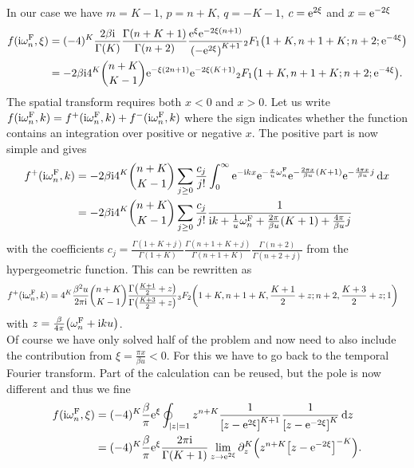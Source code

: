 \documentclass[english, parskip=full]{scrartcl}
\begin{document}
In our case we have $m = K-1$, $p = n+K$, $q = -K-1$, $c = \text{e}^{2\xi}$ and $x= \text{e}^{-2\xi}$
\begin{align}
f(\i\omega_n^\F, \xi) &= (-4)^K \frac{2\beta\i}{\Gamma(K)} \frac{\Gamma(n+K+1)}{\Gamma(n+2)} \frac{\powe{\xi} \powe{-2\xi (n+1)}}{\kla*{-\powe{2\xi}}^{K+1}} {}_2F_1\kla*{1+K, n+1+K; n + 2; \powe{-4\xi}}\\
&= -2\beta \i 4^K \binom{n+K}{K-1} \powe{-\xi(2n+1)} \powe{-2\xi (K+1)} {}_2F_1\kla*{1 + K, n+1+K; n+2; \powe{-4\xi}}.
\end{align}
The spatial transform requires both $x<0$ and $x>0$.
Let us write $f(\text{i}\omega_n^{\text{F}}, k) = f^{+}(\text{i}\omega_n^{\text{F}}, k) + f^{-}(\text{i}\omega_n^{\text{F}}, k)$ where the sign indicates whether the function contains an integration over positive or negative $x$.
The positive part is now simple and gives
\begin{align}
f^{+}(\text{i}\omega_n^{\text{F}}, k) &= -2\beta \text{i} 4^K \binom{n+K}{K-1} \sum_{j\ge 0} \frac{c_j}{j!} \int_{0}^{\infty} \text{e}^{-\text{i} kx} \text{e}^{-\frac{x}{u} \omega_n^{\text{F}}} \text{e}^{-\frac{2\pi x}{\beta u} (K+1)} \text{e}^{- \frac{4\pi x}{\beta u}j}  \,\mathrm{d}x\\
&= -2\beta \text{i} 4^K \binom{n+K}{K-1} \sum_{j\ge 0} \frac{c_j}{j!} \frac{1}{\text{i} k + \frac{1}{u} \omega_n^{\text{F}} + \frac{2\pi}{\beta u} (K+1) + \frac{4\pi}{\beta u}j}
\end{align}
with the coefficients $c_j = \frac{\Gamma(1 + K + j)}{\Gamma(1 + K)} \frac{\Gamma(n + 1 + K + j)}{\Gamma(n + 1 + K)} \frac{\Gamma(n+2)}{\Gamma(n+2+j)}$ from the hypergeometric function.
This can be rewritten as
\begin{align}
f^{+}(\i\omega_n^\F, k) &= 4^K \frac{\beta^2u}{2\pi\i} \binom{n+K}{K-1} \frac{\Gamma\kla*{\frac{K+1}{2} + z}}{\Gamma\kla*{\frac{K+3}{2} + z}} {}_3F_2\kla*{1 + K, n+1+K, \frac{K+1}{2} + z; n+2, \frac{K+3}{2} + z; 1}
\end{align}
with $z = \frac{\beta}{4\pi} \kla*{\omega_n^\F + \i ku}$.
\\
Of course we have only solved half of the problem and now need to also include the contribution from $\xi = \frac{\pi x}{\beta u} < 0$.
For this we have to go back to the temporal Fourier transform.
Part of the calculation can be reused, but the pole is now different and thus we fine
\begin{align}
f(\i\omega_n^\F, \xi) &= (-4)^K \frac{\beta}{\pi} \powe{\xi} \oint_{|z|=1} z^{n+K} \frac{1}{\klb*{z - \powe{2\xi}}^{K+1}} \frac{1}{\klb*{z - \powe{-2\xi}}^K}\,\d z\\
&= (-4)^K \frac{\beta}{\pi} \powe{\xi} \frac{2\pi\i}{\Gamma(K+1)} \lim_{z\rightarrow \powe{2\xi}} \partial_z^{K} \kla*{z^{n+K} \klb*{z - \powe{-2\xi}}^{-K}}.
\end{align}
\end{document}
